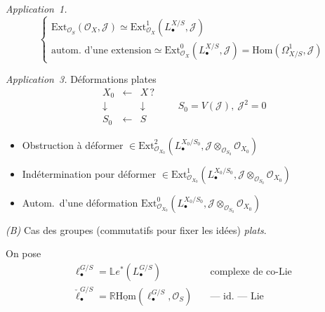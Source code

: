 \documentclass[11pt,a4paper]{article}
\begin{document}
\emph{Application~1.}
\[
\left\lbrace
\begin{array}{l}
\mathrm{Ext}_{\mathcal{O}_S}(\mathcal{O}_X, \mathcal{J}) \simeq \mathrm{Ext}^1_{\mathcal{O}_X}(L^{X/S}_{\bullet}, \mathcal{J}) \\[2pt]
\text{autom.\ d'une extension} \simeq \mathrm{Ext}^0_{\mathcal{O}_X}(L^{X/S}_{\bullet}, \mathcal{J}) = \mathrm{Hom}(\Omega^1_{X/S}, \mathcal{J})
\end{array}
\right.
\]

\emph{Application~3.} Déformations plates
\[
\begin{array}{ccc}
X_0 & \longleftarrow & X\,? \\
\downarrow & & \downarrow \\
S_0 & \longleftarrow & S
\end{array}
\qquad S_0 = V(\mathcal{J}),\ \mathcal{J}^2 = 0
\]
\begin{itemize}
  \item[a)] Obstruction à déformer $\in \mathrm{Ext}^2_{\mathcal{O}_{X_0}}(L^{X_0/S_0}_{\bullet}, \mathcal{J} \otimes_{\mathcal{O}_{S_0}} \mathcal{O}_{X_0})$
  \item[b)] Indétermination pour déformer $\in \mathrm{Ext}^1_{\mathcal{O}_{X_0}}(L^{X_0/S_0}_{\bullet}, \mathcal{J} \otimes_{\mathcal{O}_{S_0}} \mathcal{O}_{X_0})$
  \item[c)] Autom.\ d'une déformation $\mathrm{Ext}^0_{\mathcal{O}_{X_0}}(L^{X_0/S_0}_{\bullet}, \mathcal{J} \otimes_{\mathcal{O}_{S_0}} \mathcal{O}_{X_0})$
\end{itemize}

\emph{(B)} Cas des groupes (commutatifs pour fixer les idées) \emph{plats}.

On pose
\[
\begin{array}{ll}
\ell^{G/S}_{\bullet} = \mathbb{L}e^{*}(L^{G/S}_{\bullet}) & \quad \text{complexe de co-Lie} \\
\check{\ell}^{G/S}_{\bullet} = \mathbb{R}\underline{\mathrm{Hom}}(\ell^{G/S}_{\bullet}, \mathcal{O}_S) & \quad \text{— id. — Lie}
\end{array}
\]
\end{document}
